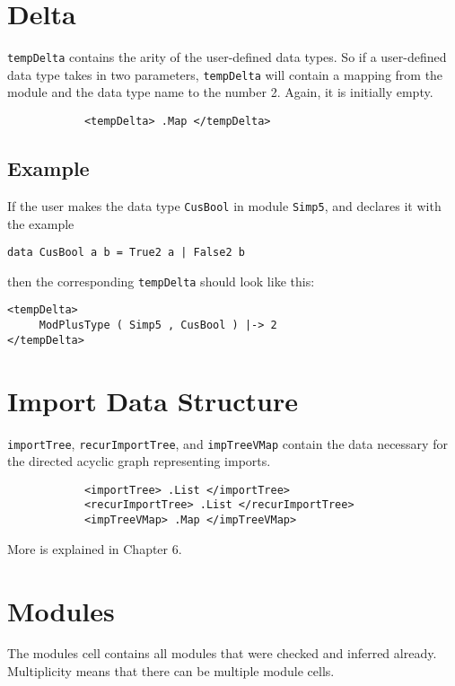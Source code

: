 \section{Delta}

\texttt{tempDelta} contains the arity of the user-defined data types. So if a user-defined data type takes in two parameters, \texttt{tempDelta} will contain a mapping from the module and the data type name to the number 2. Again, it is initially empty.

\begin{lstlisting}
            <tempDelta> .Map </tempDelta>
\end{lstlisting}

\subsection{Example}
If the user makes the data type \texttt{CusBool} in module \texttt{Simp5}, and declares it with the example
\begin{lstlisting}
data CusBool a b = True2 a | False2 b
\end{lstlisting}

\noindent
then the corresponding \texttt{tempDelta} should look like this:

\begin{lstlisting}
<tempDelta>
     ModPlusType ( Simp5 , CusBool ) |-> 2
</tempDelta>
\end{lstlisting}

\section{Import Data Structure}

\texttt{importTree}, \texttt{recurImportTree}, and \texttt{impTreeVMap} contain the data necessary for the directed acyclic graph representing imports.

\begin{lstlisting}
            <importTree> .List </importTree>
            <recurImportTree> .List </recurImportTree>
            <impTreeVMap> .Map </impTreeVMap>
\end{lstlisting}

More is explained in Chapter 6.

\section{Modules}

The modules cell contains all modules that were checked and inferred already. Multiplicity means that there can be multiple module cells.

